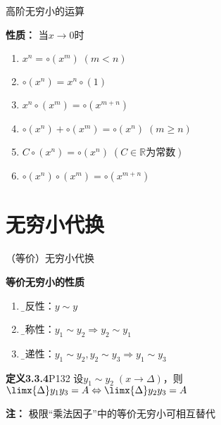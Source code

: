 \begin{frame}{高阶无穷小的运算}
	\linespread{1.2}\pause 
	\begin{alertblock}{{\bf 性质：}\hfill }
		当$x\to 0$时\pause 
		\begin{enumerate}
		  \item $x^n=\circ(x^m)\;(m<n)$\pause 
		  \item $\circ(x^n)=x^n\circ(1)$\pause 
		  \item $x^n\circ(x^m)=\circ(x^{m+n})$\pause 
		  \item $\circ(x^n)+\circ(x^m)=\circ(x^n)\;(m\geq n)$\pause 
		  \item $C\circ(x^n)=\circ(x^n)\;(C\in\mathbb{R}\mbox{为常数})$\pause 
		  \item $\circ(x^n)\circ(x^m)=\circ(x^{m+n})$
		\end{enumerate}
	\end{alertblock}
\end{frame}

\section{无穷小代换}

\begin{frame}{（等价）无穷小代换}
	\linespread{1.2}\pause 
	\begin{block}{{\bf 等价无穷小的性质}\hfill}
		\begin{enumerate}\pause 
		  \item {\b 自反性：}\pause $y\sim y$\pause 
		  \item {\b 对称性：}\pause $y_1\sim y_2\Rightarrow y_2\sim y_1$\pause 
		  \item {\b 传递性：}\pause $y_1\sim y_2,y_2\sim y_3\Rightarrow y_1\sim y_3$\pause 
		\end{enumerate}
	\end{block}
	\begin{block}{{\bf 定义3.3.4}\hfill P132}
		设$y_1\sim
		y_2\;(x\to\Delta)$，则$\limx{\Delta}y_1y_3=A\Leftrightarrow\limx{\Delta}y_2y_3=A$
	\end{block}\pause 
	{\bf 注：}\alert{ 极限“乘法因子”中的等价无穷小可相互替代}
\end{frame}

